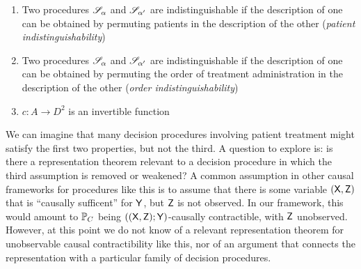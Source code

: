 \begin{enumerate}
    \item Two procedures $\mathscr{S}_\alpha$ and $\mathscr{S}_{\alpha'}$ are indistinguishable if the description of one can be obtained by permuting patients in the description of the other (\emph{patient indistinguishability})
    \item Two procedures $\mathscr{S}_\alpha$ and $\mathscr{S}_{\alpha'}$ are indistinguishable if the description of one can be obtained by permuting the order of treatment administration in the description of the other (\emph{order indistinguishability})
    \item $c:A\to D^2$ is an invertible function
\end{enumerate}

We can imagine that many decision procedures involving patient treatment might satisfy the first two properties, but not the third. A question to explore is: is there a representation theorem relevant to a decision procedure in which the third assumption is removed or weakened? A common assumption in other causal frameworks for procedures like this is to assume that there is some variable $(\mathsf{X},\mathsf{Z})$ that is ``causally sufficent'' for $\mathsf{Y}$, but $\mathsf{Z}$ is not observed. In our framework, this would amount to $\mathbb{P}_C$ being $((\mathsf{X},\mathsf{Z});\mathsf{Y})$-causally contractible, with $\mathsf{Z}$ unobserved. However, at this point we do not know of a relevant representation theorem for unobservable causal contractibility like this, nor of an argument that connects the representation with a particular family of decision procedures.